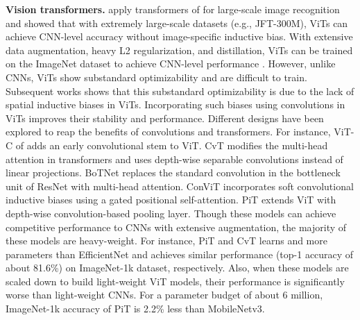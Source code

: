 \documentclass[preprint]{article} \usepackage{iclr2022_conference,times}
\begin{document}
\textbf{Vision transformers.} \citet{dosovitskiy2020image} apply transformers of \citet{vaswani2017attention} for large-scale image recognition and showed that with extremely large-scale datasets (e.g., JFT-300M), ViTs can achieve CNN-level accuracy without image-specific inductive bias. With extensive data augmentation, heavy L2 regularization, and distillation, ViTs can be trained on the ImageNet dataset to achieve CNN-level performance \citep{touvron2021training, touvron2021going, zhou2021deepvit}. However, unlike CNNs, ViTs show substandard optimizability and are difficult to train. Subsequent works \citep[e.g.,][]{graham2021levit, dai2021coatnet, liu2021swin, wang2021pyramid, yuan2021tokens, chen2021mobile} shows that this substandard optimizability is due to the lack of spatial inductive biases in ViTs. Incorporating such biases using convolutions in ViTs improves their stability and performance. Different designs have been explored to reap the benefits of convolutions and transformers. For instance, ViT-C of \citet{xiao2021early} adds an early convolutional stem to ViT. CvT \citep{wu2021cvt} modifies the multi-head attention in transformers and uses depth-wise separable convolutions instead of linear projections. BoTNet \citep{srinivas2021bottleneck} replaces the standard  convolution in the bottleneck unit of ResNet with multi-head attention. ConViT \citep{d2021convit} incorporates soft convolutional inductive biases using a gated positional self-attention. PiT \citep{heo2021rethinking} extends ViT with depth-wise convolution-based pooling layer. Though these models can achieve competitive performance to CNNs with extensive augmentation, the majority of these models are heavy-weight. For instance, PiT and CvT learns  and  more parameters than EfficientNet \citep{tan2019efficientnet} and achieves similar performance (top-1 accuracy of about 81.6\%) on ImageNet-1k dataset, respectively. Also, when these models are scaled down to build light-weight ViT models, their performance is significantly worse than light-weight CNNs. For a parameter budget of about 6 million, ImageNet-1k accuracy of PiT is 2.2\% less than MobileNetv3.
\end{document}
